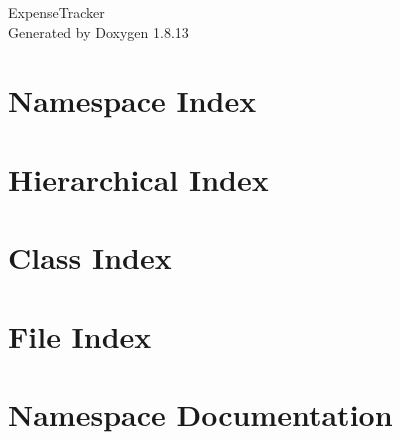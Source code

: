 \documentclass[twoside]{book}
\newcommand{\+}{\discretionary{\mbox{\scriptsize$\hookleftarrow$}}{}{}}
\newcommand{\clearemptydoublepage}{%
  \newpage{\pagestyle{empty}\cleardoublepage}%
}
\begin{document}
\hypersetup{pageanchor=false,
             bookmarksnumbered=true,
             pdfencoding=unicode
            }
\begin{titlepage}
\vspace*{7cm}
\begin{center}%
{\Large Expense\+Tracker }\\
\vspace*{1cm}
{\large Generated by Doxygen 1.8.13}\\
\end{center}
\end{titlepage}
\clearemptydoublepage
{}
\tableofcontents
\clearemptydoublepage
{}
\hypersetup{pageanchor=true}

\chapter{Namespace Index}

\chapter{Hierarchical Index}

\chapter{Class Index}

\chapter{File Index}

\chapter{Namespace Documentation}







\end{document}
